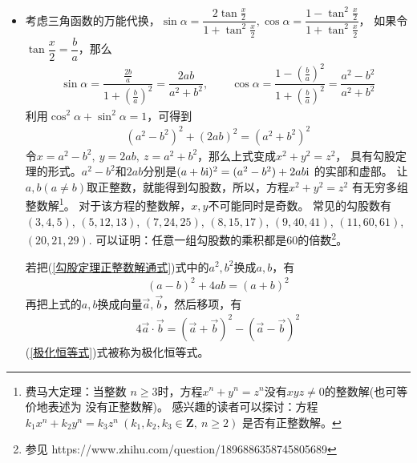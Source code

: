\begin{itemize}[leftmargin=\inteval{\myitemleftmargin}pt,itemsep=
   \inteval{\myitemitempsep}pt,topsep=\inteval{\myitemtopsep}pt]
\item 考虑三角函数的万能代换，$ \sin\alpha=\dfrac{2\tan \frac{x}{2}}{1+\tan^2 \frac{x}{2}},\cos\alpha=\dfrac{1-\tan^2 \frac{x}{2}}{1+\tan^2 \frac{x}{2}} $，
如果令$ \tan\dfrac{x}{2}=\dfrac{b}{a} $，那么
\begin{align*}
    \sin\alpha=\dfrac{\frac{2b}{a}}{1+\left(\frac{b}{a}\right)^2}=
    \dfrac{2ab}{a^2+b^2},\quad\quad \cos\alpha=\dfrac{1-\left(\frac{b}{a}
    \right)^2}{1+\left(\frac{b}{a}\right)^2}=\dfrac{a^2-b^2}{a^2+b^2}
\end{align*}
利用$ \cos^2 \alpha+\sin^2 \alpha=1 $，可得到
\begin{gather}\label{勾股定理正整数解通式}
    (a^2-b^2)^2+(2ab)^2=(a^2+b^2)^2
\end{gather}
令$ x=a^2-b^2,\ y=2ab,\ z=a^2+b^2 $，那么上式变成$ x^2+y^2=z^2 $，
具有勾股定理的形式。$ a^2-b^2 $和$ 2ab $分别是$ (a+b\mathrm{i})^2=(a^2-b^2)+2ab\mathrm{i} $
的实部和虚部。
让$ a,b (a\neq b) $取正整数，就能得到勾股数，所以，方程$ x^2+y^2=z^2 $
有无穷多组整数解\footnote{费马大定理：当整数
$ n\geq 3 $时，方程$ x^n+y^n=z^n $没有$ xyz\neq 0 $的整数解(也可等价地表述为
没有正整数解)。
感兴趣的读者可以探讨：方程$ k_1 x^n+k_2 y^n=k_3 z^n \ 
(k_1,k_2,k_3\in \textbf{Z},\ n\geq 2 ) $ 是否有正整数解。}。
对于该方程的整数解，$ x,y $不可能同时是奇数。
常见的勾股数有 $ (3,4,5)$, $(5,12,13)$, $(7,24,25)$, 
$(8,15,17)$, $(9,40,41)$, $(11,60,61)$, $(20,21,29) $. 
可以证明：任意一组勾股数的乘积都是60的倍数\footnote{
参见 https://www.zhihu.com/question/1896886358745805689}。

若把(\ref{勾股定理正整数解通式})式中的$ a^2,b^2 $换成$ a,b $，有
\begin{align*}
    (a-b)^2+4ab=(a+b)^2
\end{align*}
再把上式的$ a,b $换成向量$ \vec{a},\vec{b} $，然后移项，有
\begin{align}\label{极化恒等式}
    4 \vec{a}\cdot \vec{b}=
    (\vec{a}+\vec{b})^2-(\vec{a}-\vec{b})^2
\end{align}
(\ref{极化恒等式})式被称为极化恒等式。


\end{itemize}
